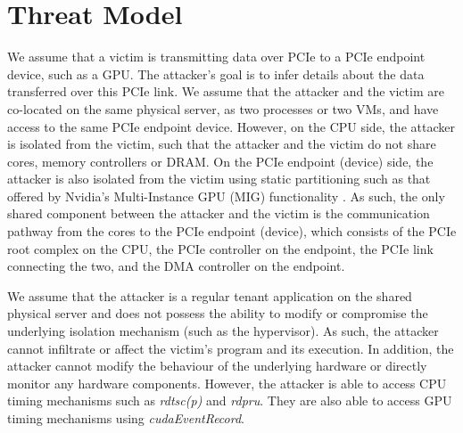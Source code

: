 \section{Threat Model}
\label{sec:interconnect-sc-threat-model}

We assume that a victim is transmitting data over PCIe to a PCIe endpoint device, such as a GPU.
The attacker's goal is to infer details about the data transferred over this PCIe link.
We assume that the attacker and the victim are co-located on the same physical server, as two processes or two VMs, and have access to the same PCIe endpoint device.
However, on the CPU side, the attacker is isolated from the victim, such that the attacker and the victim do not share cores, memory controllers or DRAM.
On the PCIe endpoint (device) side, the attacker is also isolated from the victim using static partitioning such as that offered by Nvidia's Multi-Instance GPU (MIG) functionality \cite{nvidia_mig_guide}.
As such, the only shared component between the attacker and the victim is the communication pathway from the cores to the PCIe endpoint (device), which consists of the PCIe root complex on the CPU, the PCIe controller on the endpoint, the PCIe link connecting the two, and the DMA controller on the endpoint.

We assume that the attacker is a regular tenant application on the shared physical server and does not possess the ability to modify or compromise the underlying isolation mechanism (such as the hypervisor).
As such, the attacker cannot infiltrate or affect the victim's program and its execution.
In addition, the attacker cannot modify the behaviour of the underlying hardware or directly monitor any hardware components.
However, the attacker is able to access CPU timing mechanisms such as \textit{rdtsc(p)} and \textit{rdpru}.
They are also able to access GPU timing mechanisms using \textit{cudaEventRecord}.
